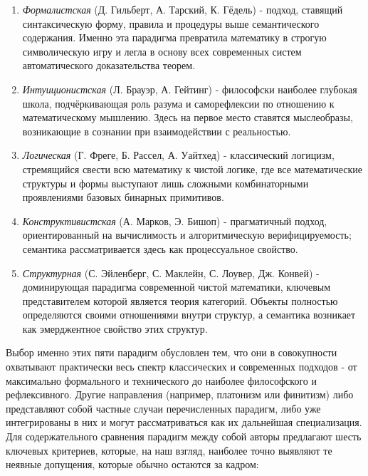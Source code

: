 \documentclass[12pt]{article}
\begin{document}
\begin{enumerate}
    \item {\it Формалистская} (Д. Гильберт, А. Тарский, К. Гёдель) - подход, ставящий синтаксическую форму, правила и процедуры выше семантического содержания. Именно эта парадигма превратила математику в строгую символическую игру и легла в основу всех современных систем автоматического доказательства теорем.
    \item {\it Интуиционистская} (Л. Брауэр, А. Гейтинг) - философски наиболее глубокая школа, подчёркивающая роль разума и саморефлексии по отношению к математическому мышлению. Здесь на первое место ставятся мыслеобразы, возникающие в сознании при взаимодействии с реальностью.
    \item {\it Логическая} (Г. Фреге, Б. Рассел, А. Уайтхед) - классический логицизм, стремящийся свести всю математику к чистой логике, где все математические структуры и формы выступают лишь сложными комбинаторными проявлениями базовых бинарных примитивов.
    \item {\it Конструктивистская} (А. Марков, Э. Бишоп) - прагматичный подход, ориентированный на вычислимость и алгоритмическую верифицируемость; семантика рассматривается здесь как процессуальное свойство.
    \item {\it Структурная} (С. Эйленберг, С. Маклейн, С. Лоувер, Дж. Конвей) - доминирующая парадигма современной чистой математики, ключевым представителем которой является теория категорий. Объекты полностью определяются своими отношениями внутри структур, а семантика возникает как эмерджентное свойство этих структур.
\end{enumerate}

Выбор именно этих пяти парадигм обусловлен тем, что они в совокупности охватывают практически весь спектр классических и современных подходов - от максимально формального и технического до наиболее философского и рефлексивного. Другие направления (например, платонизм или финитизм) либо представляют собой частные случаи перечисленных парадигм, либо уже интегрированы в них и могут рассматриваться как их дальнейшая специализация. Для содержательного сравнения парадигм между собой авторы предлагают шесть ключевых критериев, которые, на наш взгляд, наиболее точно выявляют те неявные допущения, которые обычно остаются за кадром:
\end{document}
